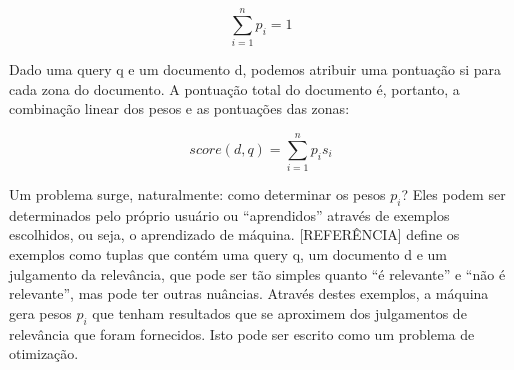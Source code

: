 \begin{displaymath}
	\sum_{i=1}^{n} p_{i} = 1
\end{displaymath}

Dado uma query q e um documento d, podemos atribuir uma pontuação si para cada zona do documento. A pontuação total do documento é, portanto, a combinação linear dos pesos e as pontuações das zonas:

\begin{displaymath}
	score(d,q)= \sum_{i=1}^{n} p_{i} s_{i}
\end{displaymath}

Um problema surge, naturalmente: como determinar os pesos $p_{i}$? Eles podem ser determinados pelo próprio usuário ou “aprendidos” através de exemplos escolhidos, ou seja, o aprendizado de máquina. [REFERÊNCIA] define os exemplos como tuplas que contém uma query q, um documento d e um julgamento da relevância, que pode ser tão simples quanto “é relevante” e “não é relevante”, mas pode ter outras nuâncias. Através destes exemplos, a máquina gera pesos $p_{i}$ que tenham resultados que se aproximem dos julgamentos de relevância que foram fornecidos. Isto pode ser escrito como um problema de otimização.